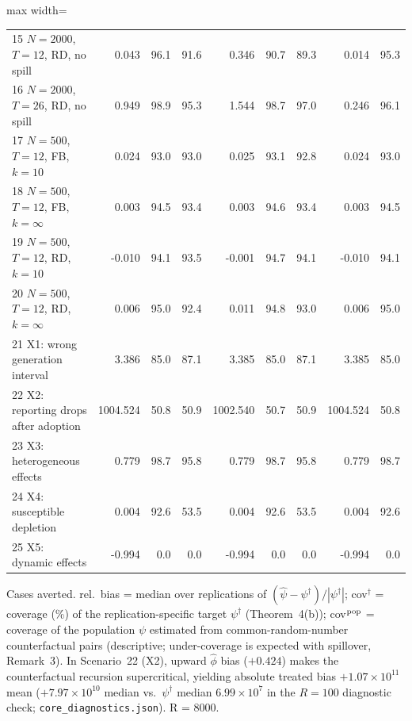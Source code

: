 \begin{table}[!t]
\begin{adjustbox}{max width=\linewidth}
\begin{tabular}{lrrrrrrrr}
15 $N=2000$, $T=12$, RD, no spill & 0.043 & 96.1 & 91.6 & 0.346 & 90.7 & 89.3 & 0.014 & 95.3 \\
16 $N=2000$, $T=26$, RD, no spill & 0.949 & 98.9 & 95.3 & 1.544 & 98.7 & 97.0 & 0.246 & 96.1 \\
17 $N=500$, $T=12$, FB, $k=10$ & 0.024 & 93.0 & 93.0 & 0.025 & 93.1 & 92.8 & 0.024 & 93.0 \\
18 $N=500$, $T=12$, FB, $k=\infty$ & 0.003 & 94.5 & 93.4 & 0.003 & 94.6 & 93.4 & 0.003 & 94.5 \\
19 $N=500$, $T=12$, RD, $k=10$ & -0.010 & 94.1 & 93.5 & -0.001 & 94.7 & 94.1 & -0.010 & 94.1 \\
20 $N=500$, $T=12$, RD, $k=\infty$ & 0.006 & 95.0 & 92.4 & 0.011 & 94.8 & 93.0 & 0.006 & 95.0 \\
21 X1: wrong generation interval & 3.386 & 85.0 & 87.1 & 3.385 & 85.0 & 87.1 & 3.385 & 85.0 \\
22 X2: reporting drops after adoption & 1004.524 & 50.8 & 50.9 & 1002.540 & 50.7 & 50.9 & 1004.524 & 50.8 \\
23 X3: heterogeneous effects & 0.779 & 98.7 & 95.8 & 0.779 & 98.7 & 95.8 & 0.779 & 98.7 \\
24 X4: susceptible depletion & 0.004 & 92.6 & 53.5 & 0.004 & 92.6 & 53.5 & 0.004 & 92.6 \\
25 X5: dynamic effects & -0.994 & 0.0 & 0.0 & -0.994 & 0.0 & 0.0 & -0.994 & 0.0 \\
\bottomrule
\end{tabular}
\end{adjustbox}
\par\smallskip\parbox{\linewidth}{\scriptsize Cases averted. rel.\ bias = median over replications of $(\hat\psi-\psi^\dagger)/|\psi^\dagger|$; cov$^\dagger$ = coverage (\%) of the replication-specific target $\psi^\dagger$ (Theorem~4(b)); cov$^{\rm pop}$ = coverage of the population $\psi$ estimated from common-random-number counterfactual pairs (descriptive; under-coverage is expected with spillover, Remark~3). In Scenario~22 (X2), upward $\hat\phi$ bias ($+0.424$) makes the counterfactual recursion supercritical, yielding absolute treated bias $+1.07\times 10^{11}$ mean ($+7.97\times 10^{10}$ median vs.\ $\psi^\dagger$ median $6.99\times 10^7$ in the $R=100$ diagnostic check; \texttt{core\_diagnostics.json}). R = 8000.}
\end{table}
